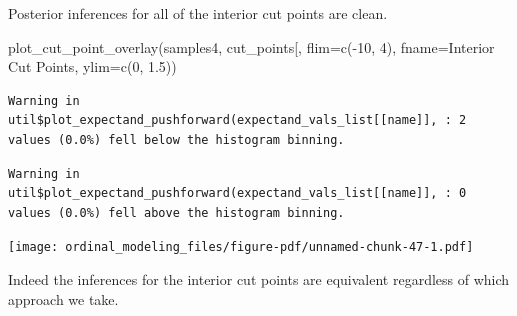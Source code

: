 \documentclass[
  letterpaper,
  DIV=11,
  numbers=noendperiod]{scrartcl}
\newenvironment{Shaded}{\begin{snugshade}}{\end{snugshade}}
\newcommand{\AttributeTok}[1]{\textcolor[rgb]{0.40,0.45,0.13}{#1}}
\newcommand{\DecValTok}[1]{\textcolor[rgb]{0.68,0.00,0.00}{#1}}
\newcommand{\FloatTok}[1]{\textcolor[rgb]{0.68,0.00,0.00}{#1}}
\newcommand{\FunctionTok}[1]{\textcolor[rgb]{0.28,0.35,0.67}{#1}}
\newcommand{\NormalTok}[1]{\textcolor[rgb]{0.00,0.23,0.31}{#1}}
\newcommand{\SpecialCharTok}[1]{\textcolor[rgb]{0.37,0.37,0.37}{#1}}
\newcommand{\StringTok}[1]{\textcolor[rgb]{0.13,0.47,0.30}{#1}}
\begin{document}
Posterior inferences for all of the interior cut points are clean.

\begin{Shaded}
\begin{Highlighting}[]
\FunctionTok{plot\_cut\_point\_overlay}\NormalTok{(samples4, }\StringTok{\textquotesingle{}cut\_points[\textquotesingle{}}\NormalTok{,}
                       \AttributeTok{flim=}\FunctionTok{c}\NormalTok{(}\SpecialCharTok{{-}}\DecValTok{10}\NormalTok{, }\DecValTok{4}\NormalTok{), }\AttributeTok{fname=}\StringTok{\textquotesingle{}Interior Cut Points\textquotesingle{}}\NormalTok{,}
                       \AttributeTok{ylim=}\FunctionTok{c}\NormalTok{(}\DecValTok{0}\NormalTok{, }\FloatTok{1.5}\NormalTok{))}
\end{Highlighting}
\end{Shaded}

\begin{verbatim}
Warning in util$plot_expectand_pushforward(expectand_vals_list[[name]], : 2
values (0.0%) fell below the histogram binning.
\end{verbatim}

\begin{verbatim}
Warning in util$plot_expectand_pushforward(expectand_vals_list[[name]], : 0
values (0.0%) fell above the histogram binning.
\end{verbatim}

\texttt{[image: ordinal\_modeling\_files/figure-pdf/unnamed-chunk-47-1.pdf]}

Indeed the inferences for the interior cut points are equivalent
regardless of which approach we take.
\end{document}
